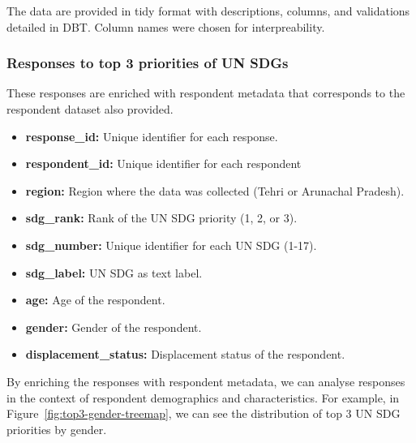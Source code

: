 \documentclass{article}
\begin{document}
The data are provided in tidy format with descriptions, columns, and validations detailed in DBT. Column names were chosen for interpreability. 

\subsubsection{Responses to top 3 priorities of UN SDGs}

These responses are enriched with respondent metadata that corresponds to the respondent dataset also provided. 
\begin{itemize}
  \item \textbf{response\_id:} Unique identifier for each response.
  \item \textbf{respondent\_id:} Unique identifier for each respondent
  \item \textbf{region:} Region where the data was collected (Tehri or Arunachal Pradesh).
  \item \textbf{sdg\_rank:} Rank of the UN SDG priority (1, 2, or 3).
  \item \textbf{sdg\_number:} Unique identifier for each UN SDG (1-17).
  \item \textbf{sdg\_label:} UN SDG as text label.
  \item \textbf{age:} Age of the respondent.
  \item \textbf{gender:} Gender of the respondent.
  \item \textbf{displacement\_status:} Displacement status of the respondent.
\end{itemize}

By enriching the responses with respondent metadata, we can analyse responses in the context of respondent demographics and characteristics. For example, in Figure~\ref{fig:top3-gender-treemap}, we can see the distribution of top 3 UN SDG priorities by gender.
\end{document}
